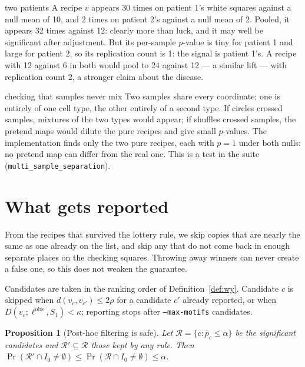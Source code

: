 \documentclass[11pt,a4paper]{article}
\newtheorem{proposition}[definition]{Proposition}
\theoremstyle{remark}
\newcommand{\lab}{\ell}
\newcommand{\obs}{\mathrm{obs}}
\begin{document}
\begin{example}{two patients}
A recipe $v$ appears 30 times on patient 1's white squares against a null mean
of 10, and 2 times on patient 2's against a null mean of 2. Pooled, it appears
32 times against 12: clearly more than luck, and it may well be significant
after adjustment. But its per-sample $p$-value is tiny for patient 1 and large
for patient 2, so its replication count is 1: the signal is patient 1's. A
recipe with 12 against 6 in both would pool to 24 against 12 --- a similar
lift --- with replication count 2, a stronger claim about the disease.
\end{example}

\begin{example}{checking that samples never mix}
Two samples share every coordinate; one is entirely of one cell type, the
other entirely of a second type. If circles crossed samples, mixtures of the
two types would appear; if shuffles crossed samples, the pretend maps would
dilute the pure recipes and give small $p$-values. The implementation finds
only the two pure recipes, each with $p=1$ under both nulls: no pretend map
can differ from the real one. This is a test in the suite
(\texttt{multi\_sample\_separation}).
\end{example}

\section{What gets reported}
\label{sec:report}

\begin{plain}
From the recipes that survived the lottery rule, we skip copies that are
nearly the same as one already on the list, and skip any that do not come back
in enough separate places on the checking squares. Throwing away winners can
never create a false one, so this does not weaken the guarantee.
\end{plain}

Candidates are taken in the ranking order of Definition~\ref{def:wy}.
Candidate $c$ is skipped when $d(v_c,v_{c'})\le2\rho$ for a candidate $c'$
already reported, or when $D(v_c;\lab^{\obs},S_1)<\kappa$; reporting stops
after \texttt{--max-motifs} candidates.

\begin{proposition}[Post-hoc filtering is safe]
Let $\mathcal R=\{c:\bar p_c\le\alpha\}$ be the significant candidates and
$\mathcal R'\subseteq\mathcal R$ those kept by any rule. Then
$\Pr(\mathcal R'\cap I_0\ne\emptyset)\le\Pr(\mathcal R\cap I_0\ne\emptyset)\le\alpha$.
\end{proposition}
\end{document}
